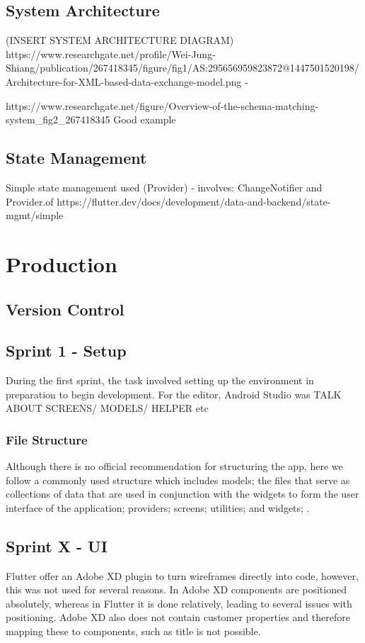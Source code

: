 \documentclass[12pt]{article}
\begin{document}
	\subsection{System Architecture}
	(INSERT SYSTEM ARCHITECTURE DIAGRAM)
	https://www.researchgate.net/profile/Wei-Jung-Shiang/publication/267418345/figure/fig1/AS:295656959823872@1447501520198/Architecture-for-XML-based-data-exchange-model.png - 
	
	https://www.researchgate.net/figure/Overview-of-the-schema-matching-system\_fig2\_267418345
	Good example
	
	\subsection{State Management}
	
	Simple state management used (Provider) -
	involves: ChangeNotifier and Provider.of
	https://flutter.dev/docs/development/data-and-backend/state-mgmt/simple
	
	\section{Production}
	\subsection{Version Control}
	
	
	\subsection{Sprint 1 - Setup}
	During the first sprint, the task involved setting up the environment in preparation to begin development. For the editor, Android Studio was 
	TALK ABOUT SCREENS/ MODELS/ HELPER etc
	\subsubsection{File Structure}
	Although there is no official recommendation for structuring the app, here we follow a commonly used structure which includes models; the files that serve as collections of data that are used in conjunction with the widgets to form the user interface of the application; providers; screens; utilities; and widgets; .
	
	
	
	\subsection{Sprint X - UI}
	Flutter offer an Adobe XD plugin to turn wireframes directly into code, however, this was not used for several reasons. In Adobe XD components are positioned absolutely, whereas in Flutter it is done relatively, leading to several issues with positioning. Adobe XD also does not contain customer properties and therefore mapping these to components, such as title is not possible.
	
\end{document}

